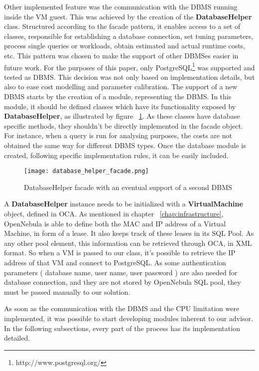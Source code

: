 Other implemented feature was the communication with the DBMS running inside the VM guest. This was achieved by the creation of the \textbf{DatabaseHelper} class. Structured according to the facade pattern, it enables access to a set of classes, responsible for establishing a database connection, set tuning parameters, process single queries or workloads, obtain estimated and actual runtime costs, etc. This pattern was chosen to make the support of other DBMSes easier in future work. For the purposes of this paper, only PostgreSQL\footnote{http://www.postgresql.org/} was supported and tested as DBMS. This decision was not only based on implementation details, but also to ease cost modelling and parameter calibration. The support of a new DBMS starts by the creation of a module, representing the DBMS. In this module,  it should be defined classes which have its functionality exposed by \textbf{DatabaseHelper}, as illustrated by figure ~\ref{fig:facade}. As these classes have database specific methods, 
they shouldn't be 
directly implemented in the facade object. For instance, when a query is run for analysing purposes, the costs are not obtained the same way for different DBMS types. Once the database module is created, following specific implementation rules, it can be easily included. 

\begin{figure}[ht]
  \centering
 \texttt{[image: database\_helper\_facade.png]}
  \caption{DatabaseHelper facade with an eventual support of a second DBMS}
  \label{fig:facade}
\end{figure}

A \textbf{DatabaseHelper} instance needs to be initialized with a \textbf{VirtualMachine} object, defined in OCA. As mentioned in chapter ~\ref{chap:infrastructure}, OpenNebula is able to define both the MAC and IP address of a Virtual Machine, in form of a lease. It also keeps track of these leases in its SQL Pool. As any other pool element, this information can be retrieved through OCA, in XML format. So when a VM is passed to our class, it's possible to retrieve the IP address of that VM and connect to PostgreSQL. As some authentication parameters ( database name, user name, user password ) are also needed for database connection, and they are not stored by OpenNebula SQL pool, they must be passed manually to our solution.

As soon as the communication with the DBMS and the CPU limitation were implemented, it was possible to start developing modules inherent to our advisor. In the following subsections, every part of the process has its implementation detailed.

